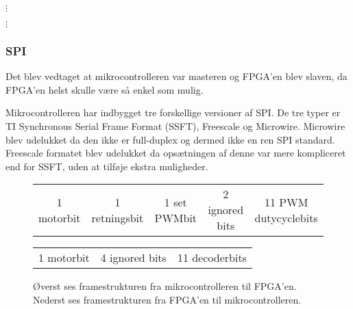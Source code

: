 
\(\vdots\)

\(\vdots\)

        
\subsubsection{SPI}
\label{sec:spi-implementering}
Det blev vedtaget at mikrocontrolleren var masteren og FPGA'en blev slaven, da FPGA'en helst skulle være så enkel som mulig.

Mikrocontrolleren har indbygget tre forskellige versioner af SPI. De tre typer er TI Synchronous Serial Frame Format (SSFT), Freescale og Microwire. 
Microwire blev udelukket da den ikke er full-duplex og dermed ikke en ren SPI standard. 
Freescale formatet blev udelukket da opsætningen af denne var mere kompliceret end for SSFT, uden at tilføje ekstra muligheder.


\begin{figure}[th!]
\centering
\begin{tabular}{c|c|c|c|c}
1 motorbit &1 retningsbit & 1 set PWMbit & 2 ignored bits & 11 PWM dutycyclebits\\
\end{tabular}
 \begin{tabular}{c|c|c}
 1 motorbit & 4 ignored bits & 11 decoderbits
 \end{tabular}
\captionsetup{type=figure}
\caption[SPI framestruktur]{Øverst ses framestrukturen fra mikrocontrolleren til FPGA'en. Nederst ses framestrukturen fra FPGA'en til mikrocontrolleren.}
\label{tb:protokol1}
\end{figure}


